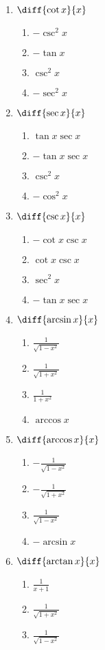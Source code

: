 \documentclass[10pt,twocolumn]{article}
\begin{document}
\begin{enumerate}
		\item \(\diff{\cot{x}}{x}\)
	\begin{enumerate}
		\item \(-\csc^2{x}\)
		\item \(-\tan{x}\)
		\item \(\csc^2{x}\)
		\item \(-\sec^2{x}\)
	\end{enumerate}


		\item \(\diff{\sec{x}}{x}\)
	\begin{enumerate}
		\item \(\tan{x} \sec{x}\)
		\item \(-\tan{x} \sec{x}\)
		\item \(\csc^2{x}\)
		\item \(-\cos^2{x}\)
	\end{enumerate}


		\item \(\diff{\csc{x}}{x}\)
	\begin{enumerate}
		\item \(-\cot{x} \csc{x}\)
		\item \(\cot{x} \csc{x}\)
		\item \(\sec^2{x}\)
		\item \(-\tan{x} \sec{x}\)
	\end{enumerate}


		\item \(\diff{\arcsin{x}}{x}\)
	\begin{enumerate}
		\item \(\frac{1}{\sqrt{1-x^2}}\)
		\item \(\frac{1}{\sqrt{1+x^2}}\)
		\item \(\frac{1}{1+x^2}\)
		\item \(\arccos{x}\)
	\end{enumerate}


		\item \(\diff{\arccos{x}}{x}\)
	\begin{enumerate}
		\item \(-\frac{1}{\sqrt{1-x^2}}\)
		\item \(-\frac{1}{\sqrt{1+x^2}}\)
		\item \(\frac{1}{\sqrt{1-x^2}}\)
		\item \(-\arcsin{x}\)
	\end{enumerate}


		\item \(\diff{\arctan{x}}{x}\)
	\begin{enumerate}
		\item \(\frac{1}{x+1}\)
		\item \(\frac{1}{\sqrt{1+x^2}}\)
		\item \(\frac{1}{\sqrt{1-x^2}}\)
	\end{enumerate}



\end{enumerate}
\end{document}
